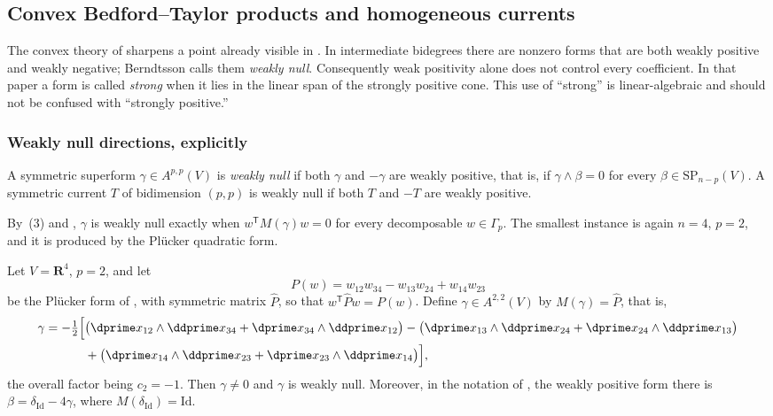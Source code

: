 \subsection{Convex Bedford--Taylor products and homogeneous currents}
\label{sec:ch14-convex-bt}

The convex theory of \cite{Ber26Convex} sharpens a point already visible in
.  In intermediate
bidegrees there are nonzero forms that are both weakly positive and weakly
negative; Berndtsson calls them \emph{weakly null}.  Consequently weak
positivity alone does not control every coefficient.  In that paper a form
is called \emph{strong} when it lies in the linear span of the strongly
positive cone.  This use of ``strong'' is linear-algebraic and should not be
confused with ``strongly positive.''

\subsubsection{Weakly null directions, explicitly}

\begin{definition}
\label{def:ch14-weakly-null}
A symmetric superform $\gamma\in A^{p,p}(V)$ is \emph{weakly null} if both
$\gamma$ and $-\gamma$ are weakly positive, that is, if
$\gamma\wedge\beta=0$ for every $\beta\in\mathrm{SP}_{n-p}(V)$.  A symmetric
current $T$ of bidimension $(p,p)$ is weakly null if both $T$ and $-T$ are
weakly positive.
\end{definition}

By \,(3) and
, $\gamma$ is weakly null exactly when
$w^{\mathsf T}M(\gamma)w=0$ for every decomposable $w\in\Gamma_p$.  The
smallest instance is again $n=4$, $p=2$, and it is produced by the Pl\"ucker
quadratic form.

\begin{example}
\label{ex:ch14-weakly-null}
Let $V=\mathbf R^4$, $p=2$, and let
\[
 P(w)=w_{12}w_{34}-w_{13}w_{24}+w_{14}w_{23}
\]
be the Pl\"ucker form of , with symmetric
matrix $\widehat P$, so that $w^{\mathsf T}\widehat Pw=P(w)$.  Define
$\gamma\in A^{2,2}(V)$ by $M(\gamma)=\widehat P$, that is,
\[
\begin{aligned}
 \gamma=-\tfrac12\Bigl[
  &\bigl(\dprime x_{12}\wedge\ddprime x_{34}
        +\dprime x_{34}\wedge\ddprime x_{12}\bigr)
  -\bigl(\dprime x_{13}\wedge\ddprime x_{24}
        +\dprime x_{24}\wedge\ddprime x_{13}\bigr)\\
  &+\bigl(\dprime x_{14}\wedge\ddprime x_{23}
        +\dprime x_{23}\wedge\ddprime x_{14}\bigr)\Bigr],
\end{aligned}
\]
the overall factor being $c_2=-1$.  Then $\gamma\neq0$ and $\gamma$ is weakly
null.  Moreover, in the notation of , the
weakly positive form there is $\beta=\delta_{\mathrm{Id}}-4\gamma$, where
$M(\delta_{\mathrm{Id}})=\mathrm{Id}$.
\end{example}

